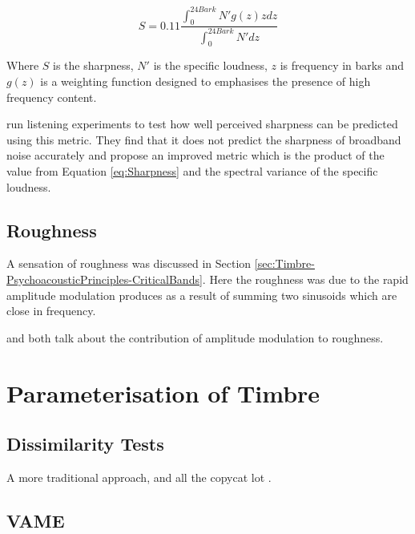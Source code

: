 		\begin{equation}
			S = 0.11\frac{\int_{0}^{24Bark} N'g(z)zdz}{\int_{0}^{24Bark}N'dz}
			\label{eq:Sharpness}
		\end{equation}

		Where $S$ is the sharpness, $N'$ is the specific loudness, $z$ is frequency in barks and $g(z)$ is a
		weighting function designed to emphasises the presence of high frequency content.

		\citet{marui2006predicting} run listening experiments to test how well perceived sharpness can be predicted
		using this metric. They find that it does not predict the sharpness of broadband noise accurately and
		propose an improved metric which is the product of the value from Equation \ref{eq:Sharpness} and the
		spectral variance of the specific loudness.

	\subsection{Roughness}
	A sensation of roughness was discussed in Section \ref{sec:Timbre-PsychoacousticPrinciples-CriticalBands}. Here the
	roughness was due to the rapid amplitude modulation produces as a result of summing two sinusoids which are close in
	frequency. 

	\note
	{
		\citet{fastl2007psychoacoustics} and \citet{vassilakis2010psychoacoustic} both talk about the contribution
		of amplitude modulation to roughness.
	}

\section{Parameterisation of Timbre}
\label{sec:Timbre-Parameterisation}

	\subsection{Dissimilarity Tests}
	\label{sec:Timbre-Dissimilarity}
		\note
		{
			A more traditional approach, \citet{grey1977multidimensional} and all the copycat lot 
			\citep{burgoyne2008a, caclin2005acoustic}.
		}

	\subsection{VAME}
	\label{sec:Timbre-VAME}


